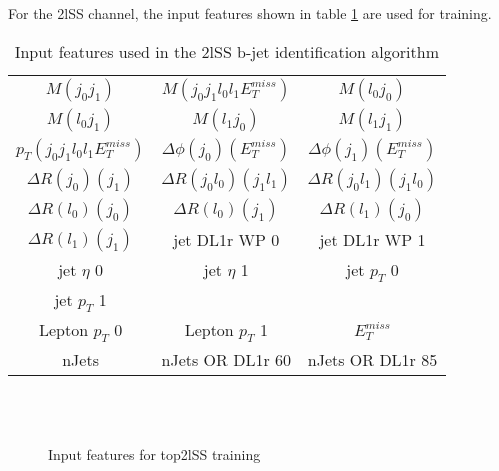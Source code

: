 For the 2lSS channel, the input features shown in table \ref{tab:top2lSSfeatures} are used for training. 

\begin{table}[h!]
  \begin{center}
  \begin{tabular}{ccc}
    $M(j_0j_1)$ & $M(j_0j_1l_0l_1E_T^{miss})$ & $M(l_0j_0)$ \\
    $M(l_0j_1)$ & $M(l_1j_0)$ & $M(l_1j_1)$ \\
    $p_T(j_0j_1l_0l_1E_T^{miss})$ & $\Delta\phi(j_0)(E_T^{miss})$ & $\Delta\phi(j_1)(E_T^{miss})$ \\
    $\Delta R(j_0)(j_1)$ & $\Delta R(j_0l_0)(j_1l_1)$ & $\Delta R(j_0l_1)(j_1l_0)$ \\
    $\Delta R(l_0)(j_0)$ & $\Delta R(l_0)(j_1)$ & $\Delta R(l_1)(j_0)$ \\
    $\Delta R(l_1)(j_1)$ & jet DL1r WP 0 & jet DL1r WP 1 \\
    jet  $\eta$ 0 & jet  $\eta$ 1 & jet  $p_T$ 0 \\
    jet  $p_T$ 1 &  \\
    Lepton  $p_T$ 0 & Lepton  $p_T$ 1 & $E_T^{miss}$ \\
    nJets & nJets OR DL1r 60 & nJets OR DL1r 85\\
  \end{tabular}
  \end{center}
  \caption{Input features used in the 2lSS b-jet identification algorithm}
  \label{tab:top2lSSfeatures}
\end{table}

\begin{figure}
    \\
    \\
    \caption{Input features for top2lSS training}
    \label{fig:features_top2lSS}                                                                                        
\end{figure}

